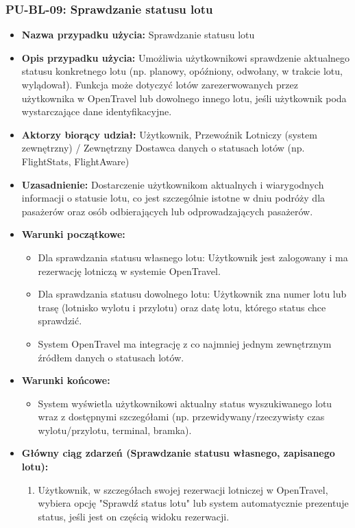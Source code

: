 \documentclass[a4paper,12pt]{article}
\begin{document}
\subsubsection{PU-BL-09: Sprawdzanie statusu lotu}
\begin{itemize}
    \item \textbf{Nazwa przypadku użycia:} Sprawdzanie statusu lotu
    \item \textbf{Opis przypadku użycia:} Umożliwia użytkownikowi sprawdzenie aktualnego statusu konkretnego lotu (np. planowy, opóźniony, odwołany, w trakcie lotu, wylądował). Funkcja może dotyczyć lotów zarezerwowanych przez użytkownika w OpenTravel lub dowolnego innego lotu, jeśli użytkownik poda wystarczające dane identyfikacyjne.
    \item \textbf{Aktorzy biorący udział:} Użytkownik, Przewoźnik Lotniczy (system zewnętrzny) / Zewnętrzny Dostawca danych o statusach lotów (np. FlightStats, FlightAware)
    \item \textbf{Uzasadnienie:} Dostarczenie użytkownikom aktualnych i wiarygodnych informacji o statusie lotu, co jest szczególnie istotne w dniu podróży dla pasażerów oraz osób odbierających lub odprowadzających pasażerów.
    \item \textbf{Warunki początkowe:}
        \begin{itemize}
            \item Dla sprawdzania statusu własnego lotu: Użytkownik jest zalogowany i ma rezerwację lotniczą w systemie OpenTravel.
            \item Dla sprawdzania statusu dowolnego lotu: Użytkownik zna numer lotu lub trasę (lotnisko wylotu i przylotu) oraz datę lotu, którego status chce sprawdzić.
            \item System OpenTravel ma integrację z co najmniej jednym zewnętrznym źródłem danych o statusach lotów.
        \end{itemize}
    \item \textbf{Warunki końcowe:}
        \begin{itemize}
            \item System wyświetla użytkownikowi aktualny status wyszukiwanego lotu wraz z dostępnymi szczegółami (np. przewidywany/rzeczywisty czas wylotu/przylotu, terminal, bramka).
        \end{itemize}
    \item \textbf{Główny ciąg zdarzeń (Sprawdzanie statusu własnego, zapisanego lotu):}
        \begin{enumerate}
            \item Użytkownik, w szczegółach swojej rezerwacji lotniczej w OpenTravel, wybiera opcję "Sprawdź status lotu" lub system automatycznie prezentuje status, jeśli jest on częścią widoku rezerwacji.

\end{enumerate}
\end{itemize}
\end{document}
